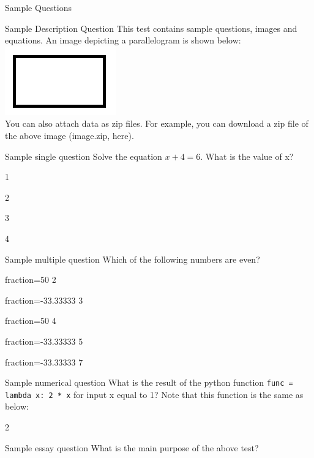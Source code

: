 \documentclass[12pt]{article}
\begin{document}
\begin{quiz}{Sample Questions}

\begin{description}{Sample Description Question}
This test contains sample questions, images and equations. An image depicting a parallelogram is shown below:\\
\includegraphics{image.png}\\
You can also attach data as zip files. For example, you can download a zip file of the above image ({{image.zip, here}}).
\end{description}

\begin{singlechoice}{Sample single question}
Solve the equation ${x + 4 = 6}$. What is the value of x?
\item 1
\item* 2
\item 3
\item 4
\end{singlechoice}

\begin{multichoice}{Sample multiple question}
Which of the following numbers are even?
\item[fraction=50] 2
\item[fraction=-33.33333] 3
\item[fraction=50] 4
\item[fraction=-33.33333] 5
\item[fraction=-33.33333] 7
\end{multichoice}

\begin{numerical}{Sample numerical question}
What is the result of the python function \texttt{func = lambda x: 2 * x} for input x equal to 1? Note that this function is the same as below:

\item 2
\end{numerical}

\begin{essay}{Sample essay question}
What is the main purpose of the above test?
\end{essay}

\end{quiz}
\end{document}
